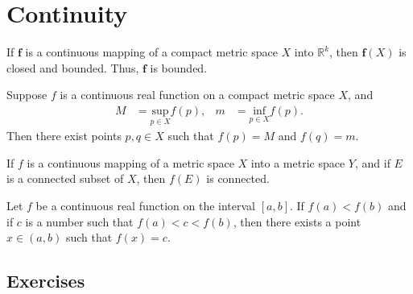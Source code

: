 \chapter{Continuity}

\setcounter{theorem}{14}
\begin{theorem}
	\label{theorem-4.15}
	If $\textbf{f}$ is a continuous mapping of a compact metric space $X$ into $\mathbb{R}^k$, then $\textbf{f}(X)$ is closed and bounded. Thus, $\textbf{f}$ is bounded.
\end{theorem}

\begin{theorem}
	\label{theorem-4.16}
	Suppose $f$ is a continuous real function on a compact metric space $X$, and
	\begin{align}
	M &= \underset{p \in X}{\text{sup}} f(p), & m &= \underset{p \in X}{\text{inf}} f(p).
	\end{align}
	Then there exist points $p,q \in X$ such that $f(p) = M$ and $f(q) = m$.
\end{theorem}

\setcounter{theorem}{21}
\begin{theorem}
	\label{theorem-4.22}
	If $f$ is a continuous mapping of a metric space $X$ into a metric space $Y$, and if $E$ is a connected subset of $X$, then $f(E)$ is connected.
\end{theorem}

\begin{theorem}
	\label{theorem-4.23}
	Let $f$ be a continuous real function on the interval $\left[ a, b \right]$. If $f(a) < f(b)$ and if $c$ is a number such that $f(a) < c < f(b)$, then there exists a point $x \in (a, b)$ such that $f(x) = c$.
\end{theorem}

\section{Exercises}

\setcounter{exercise}{13}

